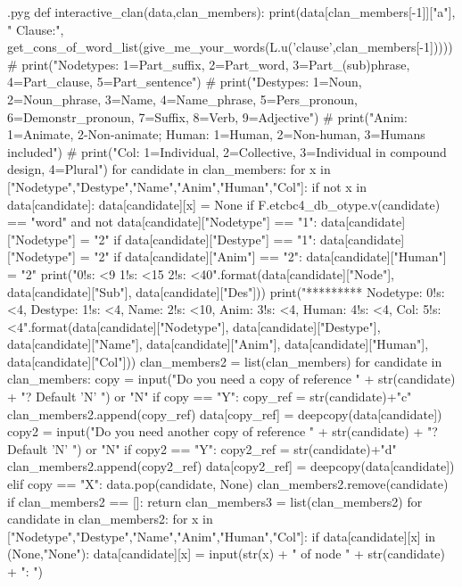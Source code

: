 \documentclass{report}
\makeatletter
\newenvironment{python}{%
  \VerbatimEnvironment
  \minted@resetoptions
  \setkeys{minted@opt}{}
      \begin{VerbatimOut}{\jobname.pyg}}
{%
      \end{VerbatimOut}
      \minted@pygmentize{python}
      \DeleteFile{\jobname.pyg}}
\makeatother
\begin{document}
\begin{python}
def interactive_clan(data,clan_members):
    print(data[clan_members[-1]]["a"], " Clause:", get_cons_of_word_list(give_me_your_words(L.u('clause',clan_members[-1]))))
#    print("Nodetypes: 1=Part_suffix, 2=Part_word, 3=Part_(sub)phrase, 4=Part_clause, 5=Part_sentence")
#    print("Destypes: 1=Noun, 2=Noun_phrase, 3=Name, 4=Name_phrase, 5=Pers_pronoun, 6=Demonstr_pronoun, 7=Suffix, 8=Verb, 9=Adjective")
#    print("Anim: 1=Animate, 2-Non-animate; Human: 1=Human, 2=Non-human, 3=Humans included")
#    print("Col: 1=Individual, 2=Collective, 3=Individual in compound design, 4=Plural")
    for candidate in clan_members:
        for x in ["Nodetype","Destype","Name","Anim","Human","Col"]:
            if not x in data[candidate]:
                data[candidate][x] = None
        if F.etcbc4_db_otype.v(candidate) == "word" and not data[candidate]["Nodetype"] == "1":
            data[candidate]["Nodetype"] = "2"
        if data[candidate]["Destype"] == "1":
            data[candidate]["Nodetype"] = "2"
        if data[candidate]["Anim"] == "2":
            data[candidate]["Human"] = "2"
        print("{0!s: <9} {1!s: <15} {2!s: <40}".format(data[candidate]["Node"], data[candidate]["Sub"], data[candidate]["Des"]))
        print("********* Nodetype: {0!s: <4}, Destype: {1!s: <4}, Name: {2!s: <10}, Anim: {3!s: <4}, Human: {4!s: <4}, Col: {5!s: <4}".format(data[candidate]["Nodetype"], data[candidate]["Destype"], data[candidate]["Name"], data[candidate]["Anim"], data[candidate]["Human"], data[candidate]["Col"]))
    clan_members2 = list(clan_members)
    for candidate in clan_members:
        copy = input("Do you need a copy of reference " + str(candidate) + "? Default 'N' ") or "N"
        if copy == "Y":
            copy_ref = str(candidate)+"c"
            clan_members2.append(copy_ref)
            data[copy_ref] = deepcopy(data[candidate])
            copy2 = input("Do you need another copy of reference " + str(candidate) + "? Default 'N' ") or "N"
            if copy2 == "Y":
                copy2_ref = str(candidate)+"d"
                clan_members2.append(copy2_ref)
                data[copy2_ref] = deepcopy(data[candidate])
        elif copy == "X":
            data.pop(candidate, None)
            clan_members2.remove(candidate)
            if clan_members2 == []:
                return
    clan_members3 = list(clan_members2)
    for candidate in clan_members2:
        for x in ["Nodetype","Destype","Name","Anim","Human","Col"]:
            if data[candidate][x] in (None,"None"):
                data[candidate][x] = input(str(x) + " of node " + str(candidate) + ": ")

\end{python}
\end{document}
